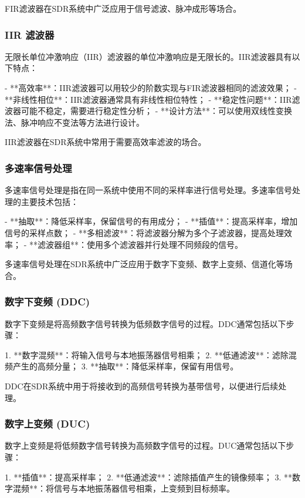 ﻿\documentclass[UTF8]{ctexbook}
\begin{document}
FIR滤波器在SDR系统中广泛应用于信号滤波、脉冲成形等场合。

\subsubsection{IIR 滤波器}

无限长单位冲激响应（IIR）滤波器的单位冲激响应是无限长的。IIR滤波器具有以下特点：

- **高效率**：IIR滤波器可以用较少的阶数实现与FIR滤波器相同的滤波效果；
- **非线性相位**：IIR滤波器通常具有非线性相位特性；
- **稳定性问题**：IIR滤波器可能不稳定，需要进行稳定性分析；
- **设计方法**：可以使用双线性变换法、脉冲响应不变法等方法进行设计。

IIR滤波器在SDR系统中常用于需要高效率滤波的场合。

\subsubsection{多速率信号处理}

多速率信号处理是指在同一系统中使用不同的采样率进行信号处理。多速率信号处理的主要技术包括：

- **抽取**：降低采样率，保留信号的有用成分；
- **插值**：提高采样率，增加信号的采样点数；
- **多相滤波**：将滤波器分解为多个子滤波器，提高处理效率；
- **滤波器组**：使用多个滤波器并行处理不同频段的信号。

多速率信号处理在SDR系统中广泛应用于数字下变频、数字上变频、信道化等场合。

\subsubsection{数字下变频 (DDC)}

数字下变频是将高频数字信号转换为低频数字信号的过程。DDC通常包括以下步骤：

1. **数字混频**：将输入信号与本地振荡器信号相乘；
2. **低通滤波**：滤除混频产生的高频分量；
3. **抽取**：降低采样率，保留有用信号。

DDC在SDR系统中用于将接收到的高频信号转换为基带信号，以便进行后续处理。

\subsubsection{数字上变频 (DUC)}

数字上变频是将低频数字信号转换为高频数字信号的过程。DUC通常包括以下步骤：

1. **插值**：提高采样率；
2. **低通滤波**：滤除插值产生的镜像频率；
3. **数字混频**：将信号与本地振荡器信号相乘，上变频到目标频率。
\end{document}
